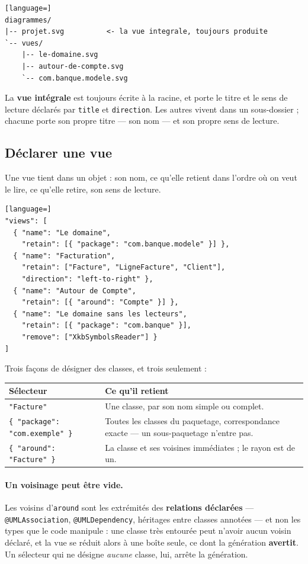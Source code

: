 \documentclass[12pt, a4paper]{article}
\begin{document}
\begin{lstlisting}[language=]
diagrammes/
|-- projet.svg          <- la vue integrale, toujours produite
`-- vues/
    |-- le-domaine.svg
    |-- autour-de-compte.svg
    `-- com.banque.modele.svg
\end{lstlisting}

La \textbf{vue intégrale} est toujours écrite à la racine, et porte le titre et le sens de lecture déclarés par \texttt{title} et \texttt{direction}. Les autres vivent dans un sous-dossier ; chacune porte son propre titre --- son nom --- et son propre sens de lecture.

\subsection{Déclarer une vue}
Une vue tient dans un objet : son nom, ce qu'elle retient dans l'ordre où on veut le lire, ce qu'elle retire, son sens de lecture.
\begin{lstlisting}[language=]
"views": [
  { "name": "Le domaine",
    "retain": [{ "package": "com.banque.modele" }] },
  { "name": "Facturation",
    "retain": ["Facture", "LigneFacture", "Client"],
    "direction": "left-to-right" },
  { "name": "Autour de Compte",
    "retain": [{ "around": "Compte" }] },
  { "name": "Le domaine sans les lecteurs",
    "retain": [{ "package": "com.banque" }],
    "remove": ["XkbSymbolsReader"] }
]
\end{lstlisting}

Trois façons de désigner des classes, et trois seulement :
\begin{center}
\begin{tabular}{@{}L{4.0cm}L{12.5cm}@{}}
\hline
\textbf{Sélecteur} & \textbf{Ce qu'il retient} \\
\hline
\texttt{"Facture"} & Une classe, par son nom simple ou complet. \\[0.4em]
\texttt{\{ "package": "com.exemple" \}} & Toutes les classes du paquetage, correspondance exacte --- un sous-paquetage n'entre pas. \\[0.4em]
\texttt{\{ "around": "Facture" \}} & La classe et ses voisines immédiates ; le rayon est de un. \\
\hline
\end{tabular}
\end{center}

\paragraph{Un voisinage peut être vide.} Les voisins d'\texttt{around} sont les extrémités des \textbf{relations déclarées} --- \texttt{@UMLAssociation}, \texttt{@UMLDependency}, héritages entre classes annotées --- et non les types que le code manipule : une classe très entourée peut n'avoir aucun voisin déclaré, et la vue se réduit alors à une boîte seule, ce dont la génération \textbf{avertit}. Un sélecteur qui ne désigne \textit{aucune} classe, lui, arrête la génération.
\end{document}
